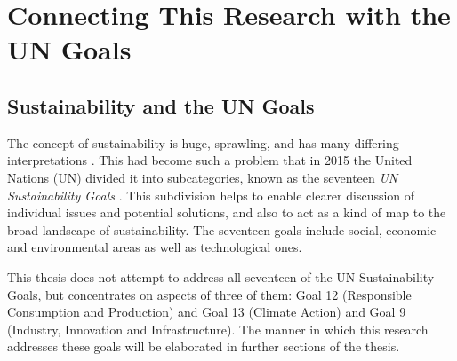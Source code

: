 \section{Connecting This Research with the UN Goals}
\label{section:connecting with UN goals}


\subsection{Sustainability and the UN Goals}

The concept of sustainability is huge, sprawling, and has many differing interpretations . This had become such a problem that in 2015 the United Nations (UN) divided it into subcategories, known as the seventeen \emph{UN Sustainability Goals} \citep{UnitedNations2015}. This subdivision helps to enable clearer discussion of individual issues and potential solutions, and also to act as a kind of map to the broad landscape of sustainability. The seventeen goals include social, economic and environmental areas as well as technological ones.

This thesis does not attempt to address all seventeen of the UN Sustainability Goals, but concentrates on aspects of three of them: Goal 12 (Responsible Consumption and Production) and Goal 13 (Climate Action) and Goal 9 (Industry, Innovation and Infrastructure). The manner in which this research addresses these goals will be elaborated in further sections of the thesis.
